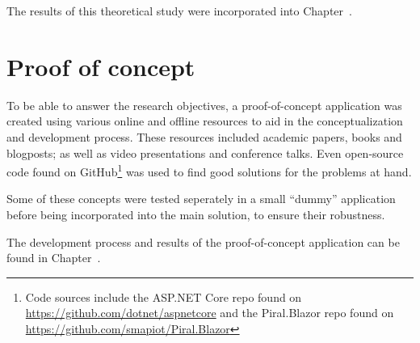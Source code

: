The results of this theoretical study were incorporated into
Chapter~. 



\section{Proof of concept}

To be able to answer the research objectives, a proof-of-concept application was
created using various online and offline resources to aid in the
conceptualization and development process. These resources included academic
papers, books and blogposts; as well as video presentations and conference
talks. Even open-source code found on GitHub\footnote{Code sources include the
ASP.NET Core repo found on \url{https://github.com/dotnet/aspnetcore} and the
Piral.Blazor repo found on \url{https://github.com/smapiot/Piral.Blazor}} was
used to find good solutions for the problems at hand.

Some of these concepts were tested seperately in a small ``dummy'' application
before being incorporated into the main solution, to ensure their robustness.

The development process and results of the proof-of-concept application can be
found in Chapter~.